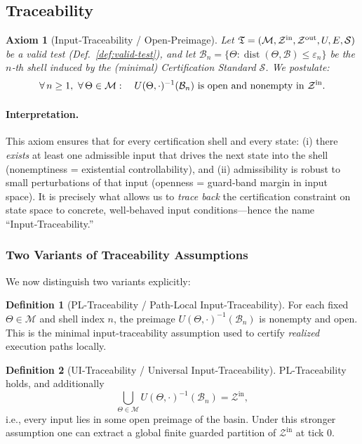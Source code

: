 \documentclass{article}
\theoremstyle{definition}
\newtheorem{definition}{Definition}[section]
\theoremstyle{plain}
\newtheorem{axiom}{Axiom}[section]
\begin{document}
\subsection{Traceability}
\begin{axiom}[Input‑Traceability / Open‑Preimage]
Let $\mathfrak T=(\mathcal M,\mathcal Z^{\rm in},\mathcal Z^{\rm out},U,E,\mathcal S)$ be a valid test (Def.~\ref{def:valid-test}), and let $\mathcal B_n=\{\Theta:\operatorname{dist}(\Theta,\mathcal B)\le\varepsilon_n\}$ be the $n$‑th shell induced by the (minimal) Certification Standard $\mathcal S$.  We postulate:
\[
  \forall\,n\ge1,\ \forall\,\Theta\in\mathcal M:\quad
  U(\Theta,\cdot)^{-1}(\mathcal B_n)
  \ \text{is open and nonempty in }\mathcal Z^{\rm in}.
\]
\end{axiom}

\paragraph{Interpretation.} 
This axiom ensures that for every certification shell and every state:
(i) there \emph{exists} at least one admissible input that drives the next state into the shell (nonemptiness = existential controllability), and 
(ii) admissibility is robust to small perturbations of that input (openness = guard‑band margin in input space).  
It is precisely what allows us to \emph{trace back} the certification constraint on state space to concrete, well‑behaved input conditions—hence the name “Input‑Traceability.”

\subsubsection*{Two Variants of Traceability Assumptions}

We now distinguish two variants explicitly:

\begin{definition}[PL-Traceability / Path-Local Input-Traceability]
For each fixed \(\Theta\in\mathcal M\) and shell index \(n\), the preimage \(U(\Theta,\cdot)^{-1}(\mathcal B_n)\) is nonempty and open. This is the minimal input-traceability assumption used to certify \emph{realized} execution paths locally.
\end{definition}

\begin{definition}[UI-Traceability / Universal Input-Traceability]
PL-Traceability holds, and additionally
\[
\bigcup_{\Theta\in\mathcal M} U(\Theta,\cdot)^{-1}(\mathcal B_n)=\mathcal Z^{\mathrm{in}},
\]
i.e., every input lies in some open preimage of the basin. Under this stronger assumption one can extract a global finite guarded partition of \(\mathcal Z^{\mathrm{in}}\) at tick 0.
\end{definition}
\end{document}
